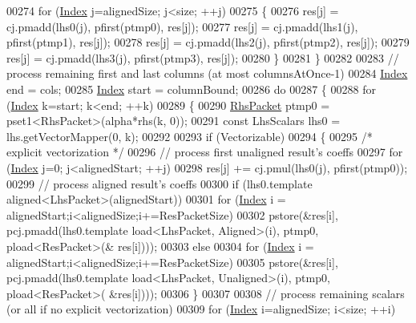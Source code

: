 \begin{DoxyCode}
{00274     \textcolor{keywordflow}{for} (\hyperlink{namespace_eigen_a62e77e0933482dafde8fe197d9a2cfde}{Index} j=alignedSize; j<size; ++j)
00275     \{
00276       res[j] = cj.pmadd(lhs0(j), pfirst(ptmp0), res[j]);
00277       res[j] = cj.pmadd(lhs1(j), pfirst(ptmp1), res[j]);
00278       res[j] = cj.pmadd(lhs2(j), pfirst(ptmp2), res[j]);
00279       res[j] = cj.pmadd(lhs3(j), pfirst(ptmp3), res[j]);
00280     \}
00281   \}
00282 
00283   \textcolor{comment}{// process remaining first and last columns (at most columnsAtOnce-1)}
00284   \hyperlink{namespace_eigen_a62e77e0933482dafde8fe197d9a2cfde}{Index} end = cols;
00285   \hyperlink{namespace_eigen_a62e77e0933482dafde8fe197d9a2cfde}{Index} start = columnBound;
00286   \textcolor{keywordflow}{do}
00287   \{
00288     \textcolor{keywordflow}{for} (\hyperlink{namespace_eigen_a62e77e0933482dafde8fe197d9a2cfde}{Index} k=start; k<end; ++k)
00289     \{
00290       \hyperlink{class_eigen_1_1internal_1_1_tensor_lazy_evaluator_writable}{RhsPacket} ptmp0 = pset1<RhsPacket>(alpha*rhs(k, 0));
00291       \textcolor{keyword}{const} LhsScalars lhs0 = lhs.getVectorMapper(0, k);
00292 
00293       \textcolor{keywordflow}{if} (Vectorizable)
00294       \{
00295         \textcolor{comment}{/* explicit vectorization */}
00296         \textcolor{comment}{// process first unaligned result's coeffs}
00297         \textcolor{keywordflow}{for} (\hyperlink{namespace_eigen_a62e77e0933482dafde8fe197d9a2cfde}{Index} j=0; j<alignedStart; ++j)
00298           res[j] += cj.pmul(lhs0(j), pfirst(ptmp0));
00299         \textcolor{comment}{// process aligned result's coeffs}
00300         \textcolor{keywordflow}{if} (lhs0.template aligned<LhsPacket>(alignedStart))
00301           \textcolor{keywordflow}{for} (\hyperlink{namespace_eigen_a62e77e0933482dafde8fe197d9a2cfde}{Index} i = alignedStart;i<alignedSize;i+=ResPacketSize)
00302             pstore(&res[i], pcj.pmadd(lhs0.template load<LhsPacket, Aligned>(i), ptmp0, pload<ResPacket>(&
      res[i])));
00303         \textcolor{keywordflow}{else}
00304           \textcolor{keywordflow}{for} (\hyperlink{namespace_eigen_a62e77e0933482dafde8fe197d9a2cfde}{Index} i = alignedStart;i<alignedSize;i+=ResPacketSize)
00305             pstore(&res[i], pcj.pmadd(lhs0.template load<LhsPacket, Unaligned>(i), ptmp0, pload<ResPacket>(
      &res[i])));
00306       \}
00307 
00308       \textcolor{comment}{// process remaining scalars (or all if no explicit vectorization)}
00309       \textcolor{keywordflow}{for} (\hyperlink{namespace_eigen_a62e77e0933482dafde8fe197d9a2cfde}{Index} i=alignedSize; i<size; ++i)
}
\end{DoxyCode}
